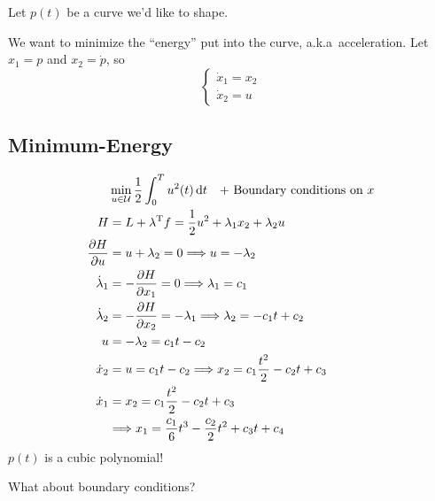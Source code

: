 Let $p(t)$ be a curve we'd like to shape.
\begin{center}
\end{center}
We want to minimize the ``energy'' put into the curve, a.k.a\ acceleration.
Let $x_1=p$ and $x_2=\dot p$, so
\[ \begin{cases}
    \dot x_1 = x_2 \\
    \dot x_2 = u
  \end{cases} \]

\subsection{Minimum-Energy}

\begin{align}
  & \min_{u\in\mathcal U} \frac{1}{2} \int_0^T u^2(t)\mathop{}\!\mathrm{d} t \quad \text{+ Boundary conditions on $x$} \\
  H &= L+\lambda^\text{T} f = \frac12 u^2 + \lambda_1 x_2 + \lambda_2 u \\
  \frac{\partial H}{\partial u} &= u + \lambda_2 = 0 \Longrightarrow u = -\lambda_2 \\
  \dot\lambda_1 &= -\frac{\partial H}{\partial x_1} = 0 \Longrightarrow \lambda_1 = c_1 \\
  \dot\lambda_2 &= -\frac{\partial H}{\partial x_2} = -\lambda_1 \Longrightarrow \lambda_2 = -c_1t+c_2 \\
  u &= -\lambda_2 = c_1t-c_2 \\
  \dot x_2 &= u = c_1t-c_2 \Longrightarrow x_2 = c_1 \frac{t^2}{2} - c_2t + c_3 \\
  \dot x_1 &= x_2 = c_1\frac{t^2}{2} -c_2t + c_3 \\
  & \Longrightarrow x_1 = \frac{c_1}{6}t^3 - \frac{c_2}{2}t^2 + c_3 t + c_4
\end{align}
$p(t)$ is a cubic polynomial!

\medskip \noindent
What about boundary conditions?

